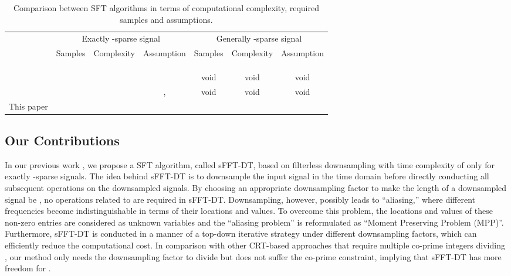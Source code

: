 \documentclass[journal,onecolumn,11pt]{IEEEtran}
\begin{document}
\begin{table}[t]
\fontsize{7.5pt}{1em}\selectfont
\centering
\setlength{\abovecaptionskip}{0pt}
\setlength{\belowcaptionskip}{4pt}
\caption{Comparison between SFT algorithms in terms of computational complexity, required samples and assumptions.}
\label{Table: SFT comparision}
\doublerulesep=0pt
\begin{tabular}[tc]{|c||c|c|c|c|c|c|}
\hline
 \multirow{2}{*}{}&    \multicolumn{3}{c|}{Exactly -sparse signal}&  \multicolumn{3}{c|}{Generally -sparse signal}  \\
\cline{2-7} & Samples  & Complexity & Assumption & Samples & Complexity & Assumption   \\ \hline\hline
\cite{Iwen2010}&   & &  & & &    \\ \hline
\cite{Haitham2012_1}&  &  &  &  &  &    \\ \hline
\cite{Ghazi2013}&  & &   & &  &     \\ \hline
\cite{Heider2013}&  &  &  & void & void & void    \\ \hline
\cite{Pawar2013}&  & & ,  & void & void & void   \\ \hline
This paper&  & &  &   &  &    \\ \hline
\end{tabular}
\end{table}

\subsection{Our Contributions}
In our previous work \cite{Hsieh2013}, we propose a SFT algorithm, called sFFT-DT, based on filterless downsampling with time complexity of  only for exactly -sparse signals.
The idea behind sFFT-DT is to downsample the input signal in the time domain before directly conducting all subsequent operations on the downsampled signals.
By choosing an appropriate downsampling factor to make the length of a downsampled signal be , no operations related to  are required in sFFT-DT.
Downsampling, however, possibly leads to ``aliasing,'' where different frequencies become indistinguishable in terms of their locations and values.
To overcome this problem, the locations and values of these  non-zero entries are considered as unknown variables and the ``aliasing problem'' is reformulated as ``Moment Preserving Problem (MPP)''.
Furthermore, sFFT-DT is conducted in a manner of a top-down iterative strategy under different downsampling factors, which can efficiently reduce the computational cost.
In comparison with other CRT-based approaches \cite{Heider2013}\cite{Pawar2013} that require multiple co-prime integers dividing , our method only needs the downsampling factor to divide  but does not suffer the co-prime constraint, implying that sFFT-DT has more freedom for .
\end{document}
